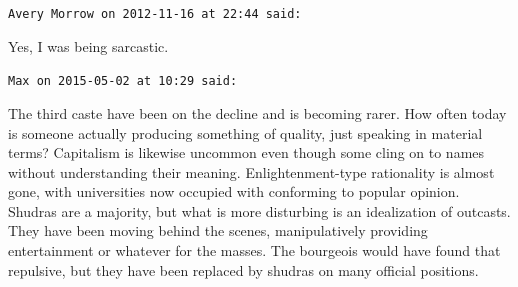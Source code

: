 \begin{footnotesize}
\begin{sffamily}
\hfill

\texttt{Avery Morrow on 2012-11-16 at 22:44 said: }

Yes, I was being sarcastic.


\hfill

\texttt{Max on 2015-05-02 at 10:29 said: }

The third caste have been on the decline and is becoming rarer. How often today is someone actually producing something of quality, just speaking in material terms? Capitalism is likewise uncommon even though some cling on to names without understanding their meaning. Enlightenment-type rationality is almost gone, with universities now occupied with conforming to popular opinion. Shudras are a majority, but what is more disturbing is an idealization of outcasts. They have been moving behind the scenes, manipulatively providing entertainment or whatever for the masses. The bourgeois would have found that repulsive, but they have been replaced by shudras on many official positions.


\end{sffamily}\end{footnotesize}
